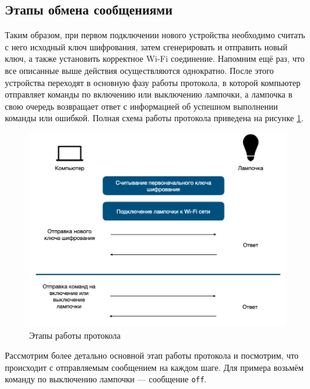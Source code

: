 	\subsection{Этапы обмена сообщениями}
	
	Таким образом, при первом подключении нового устройства необходимо считать с него исходный ключ
	шифрования, затем сгенерировать и отправить новый ключ, а также установить корректное Wi-Fi
	соединение. Напомним ещё раз, что все описанные выше действия осуществляются однократно. После
	этого устройства переходят в основную фазу работы протокола, в которой компьютер отправляет команды
	по включению или выключению лампочки, а лампочка в свою очередь возвращает ответ с информацией
	об успешном выполнении команды или ошибкой. Полная схема работы протокола приведена на 
	рисунке \ref{fig4.5}.
	
	\begin{figure}[h]
		\centering
		\includegraphics[scale=0.5]{resources/work-scheme}
		\caption{Этапы работы протокола}
		\label{fig4.5}
	\end{figure}

	Рассмотрим более детально основной этап работы протокола и посмотрим, что происходит с отправляемым
	сообщением на каждом шаге. Для примера возьмём команду по выключению лампочки --- сообщение \texttt{off}.
	
